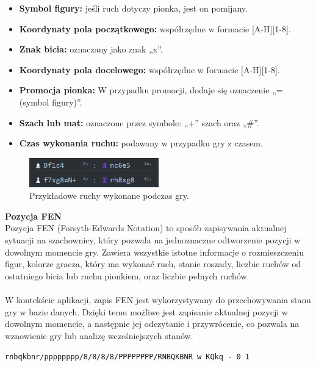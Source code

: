 \documentclass[12pt,a4paper]{article}
\begin{document}
\begin{itemize}
    \item \textbf{Symbol figury:} jeśli ruch dotyczy pionka, jest on pomijany.
    \item \textbf{Koordynaty pola początkowego:} współrzędne w formacie [A-H][1-8].
    \item \textbf{Znak bicia:} oznaczany jako znak „x”.
    \item \textbf{Koordynaty pola docelowego:} współrzędne w formacie [A-H][1-8].
    \item \textbf{Promocja pionka:} W przypadku promocji, dodaje się oznaczenie „=(symbol figury)”.
    \item \textbf{Szach lub mat:} oznaczone przez symbole: „+” szach oraz „\#”.
    \item \textbf{Czas wykonania ruchu:} podawany w przypadku gry z czasem.
\end{itemize}

\vspace{0.5cm}
\begin{figure}[h!]
    \centering
    \includegraphics[width=0.5\textwidth]{images/imp_moves.png}
    \caption{Przykładowe ruchy wykonane podczas gry.}
\end{figure}

\newpage

\noindent \textbf{Pozycja FEN}\\
Pozycja FEN (Forsyth-Edwards Notation) to sposób zapisywania aktualnej sytuacji na szachownicy, który pozwala na jednoznaczne odtworzenie pozycji w dowolnym momencie gry. Zawiera wszystkie istotne informacje o rozmieszczeniu figur, kolorze gracza, który ma wykonać ruch, stanie roszady, liczbie ruchów od ostatniego bicia lub ruchu pionkiem, oraz liczbie pełnych ruchów.
\\\\
W kontekście aplikacji, zapis FEN jest wykorzystywany do przechowywania stanu gry w bazie danych. Dzięki temu możliwe jest zapisanie aktualnej pozycji w dowolnym momencie, a następnie jej odczytanie i przywrócenie, co pozwala na wznowienie gry lub analizę wcześniejszych stanów.

\begin{center}
    \texttt{rnbqkbnr/pppppppp/8/8/8/8/PPPPPPPP/RNBQKBNR w KQkq - 0 1}
\end{center}
\end{document}
